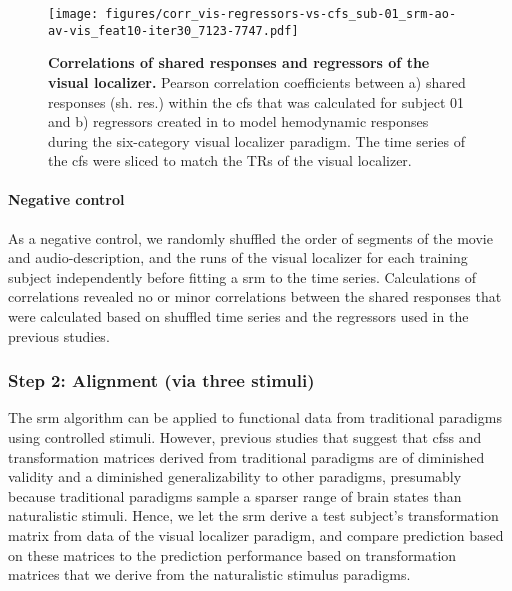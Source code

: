 \begin{figure*}[tbp]
\centering
\texttt{[image: figures/corr\_vis-regressors-vs-cfs\_sub-01\_srm-ao-av-vis\_feat10-iter30\_7123-7747.pdf]}
    \caption{
    \textbf{Correlations of shared responses and regressors of the visual
    localizer.
    }
    Pearson correlation coefficients between a) shared responses (sh. res.)
    within the \ac{cfs} that was calculated for subject 01 and b) regressors
    created in \citet{sengupta2016extension} to model hemodynamic responses
    during the six-category visual localizer paradigm.
    The time series of the \ac{cfs} were sliced to match the TRs of the
    visual localizer.
    }
    \label{fig:corr-vis-reg-srm}
\end{figure*}



\paragraph{Negative control}
As a negative control, we randomly shuffled the order of segments of the movie
and audio-description, and the runs of the visual localizer for each training
subject independently before fitting a \ac{srm} to the time series.
Calculations of correlations revealed no or minor correlations between the
shared responses that were calculated based on shuffled time series and the
regressors used in the previous studies.


\subsubsection{Step 2: Alignment (via three stimuli)}



%
The \ac{srm} algorithm can be applied to functional data from traditional
paradigms using controlled stimuli.
%
However, previous studies \citep{guntupalli2016model, haxby2011common} that
suggest that \acp{cfs} and transformation matrices derived from traditional
paradigms are of diminished validity and a diminished generalizability to other
paradigms, presumably because traditional paradigms sample a sparser range of
brain states than naturalistic stimuli.
%
Hence, we let the \ac{srm} derive a test subject's transformation matrix from
data of the visual localizer paradigm, and compare prediction based on these
matrices to the prediction performance based on transformation matrices that
we derive from the naturalistic stimulus paradigms.


